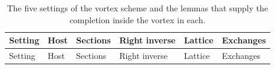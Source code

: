 \documentclass[english,11pt,a4paper]{article}
\begin{document}
\begin{longtable}[]{@{}
  >{\raggedright\arraybackslash}p{}
  >{\raggedright\arraybackslash}p{}
  >{\raggedright\arraybackslash}p{}
  >{\raggedright\arraybackslash}p{}
  >{\raggedright\arraybackslash}p{}
  >{\raggedright\arraybackslash}p{}@{}}
\caption{The five settings of the vortex scheme and the lemmas that supply the completion inside the vortex in each.}\tabularnewline
\toprule\noalign{}
\begin{minipage}[b]{\linewidth}\raggedright
Setting
\end{minipage} & \begin{minipage}[b]{\linewidth}\raggedright
Host
\end{minipage} & \begin{minipage}[b]{\linewidth}\raggedright
Sections
\end{minipage} & \begin{minipage}[b]{\linewidth}\raggedright
Right inverse
\end{minipage} & \begin{minipage}[b]{\linewidth}\raggedright
Lattice
\end{minipage} & \begin{minipage}[b]{\linewidth}\raggedright
Exchanges
\end{minipage} \\
\midrule\noalign{}
\endfirsthead
\toprule\noalign{}
\begin{minipage}[b]{\linewidth}\raggedright
Setting
\end{minipage} & \begin{minipage}[b]{\linewidth}\raggedright
Host
\end{minipage} & \begin{minipage}[b]{\linewidth}\raggedright
Sections
\end{minipage} & \begin{minipage}[b]{\linewidth}\raggedright
Right inverse
\end{minipage} & \begin{minipage}[b]{\linewidth}\raggedright
Lattice
\end{minipage} & \begin{minipage}[b]{\linewidth}\raggedright
Exchanges
\end{minipage} \\

\end{longtable}
\end{document}
